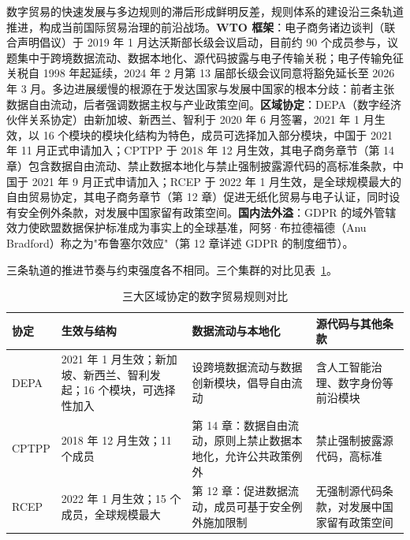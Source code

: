 数字贸易的快速发展与多边规则的滞后形成鲜明反差，规则体系的建设沿三条轨道推进，构成当前国际贸易治理的前沿战场。\textbf{WTO 框架}：电子商务诸边谈判（联合声明倡议）于 2019 年 1 月达沃斯部长级会议启动，目前约 90 个成员参与，议题集中于跨境数据流动、数据本地化、源代码披露与电子传输关税；电子传输免征关税自 1998 年起延续，2024 年 2 月第 13 届部长级会议同意将豁免延长至 2026 年 3 月。多边进展缓慢的根源在于发达国家与发展中国家的根本分歧：前者主张数据自由流动，后者强调数据主权与产业政策空间。\textbf{区域协定}：DEPA（数字经济伙伴关系协定）由新加坡、新西兰、智利于 2020 年 6 月签署，2021 年 1 月生效，以 16 个模块的模块化结构为特色，成员可选择加入部分模块，中国于 2021 年 11 月正式申请加入；CPTPP 于 2018 年 12 月生效，其电子商务章节（第 14 章）包含数据自由流动、禁止数据本地化与禁止强制披露源代码的高标准条款，中国于 2021 年 9 月正式申请加入；RCEP 于 2022 年 1 月生效，是全球规模最大的自由贸易协定，其电子商务章节（第 12 章）促进无纸化贸易与电子认证，同时设有安全例外条款，对发展中国家留有政策空间。\textbf{国内法外溢}：GDPR 的域外管辖效力使欧盟数据保护标准成为事实上的全球基准，阿努·布拉德福德（Anu Bradford）称之为"布鲁塞尔效应"（第 12 章详述 GDPR 的制度细节）。

三条轨道的推进节奏与约束强度各不相同。三个集群的对比见表~\ref{tab:digitaltrade}。

\begin{table}[htbp]
\centering
\setlength{\tabcolsep}{4pt}
\caption{三大区域协定的数字贸易规则对比}
\label{tab:digitaltrade}
\begin{tabular}{p{1.6cm}p{3.2cm}p{3.6cm}p{3.4cm}}
\hline
\textbf{协定} & \textbf{生效与结构} & \textbf{数据流动与本地化} & \textbf{源代码与其他条款} \\
\hline
DEPA & 2021 年 1 月生效；新加坡、新西兰、智利发起；16 个模块，可选择性加入 & 设跨境数据流动与数据创新模块，倡导自由流动 & 含人工智能治理、数字身份等前沿模块 \\
\hline
CPTPP & 2018 年 12 月生效；11 个成员 & 第 14 章：数据自由流动，原则上禁止数据本地化，允许公共政策例外 & 禁止强制披露源代码，高标准 \\
\hline
RCEP & 2022 年 1 月生效；15 个成员，全球规模最大 & 第 12 章：促进数据流动，成员可基于安全例外施加限制 & 无强制源代码条款，对发展中国家留有政策空间 \\
\hline
\end{tabular}
\end{table}

